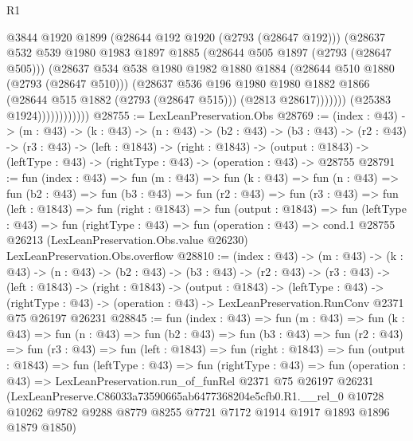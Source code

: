 \begin{lexlean}{R1}
\begin{coremodule}
                                @3844
                                @1920
                                @1899
                                (@28644 @192 @1920 (@2793 (@28647 @192)))
                                (@28637
                                  @532
                                  @539
                                  @1980
                                  @1983
                                  @1897
                                  @1885
                                  (@28644 @505 @1897 (@2793 (@28647 @505)))
                                  (@28637
                                    @534
                                    @538
                                    @1980
                                    @1982
                                    @1880
                                    @1884
                                    (@28644 @510 @1880 (@2793 (@28647 @510)))
                                    (@28637
                                      @536
                                      @196
                                      @1980
                                      @1980
                                      @1882
                                      @1866
                                      (@28644 @515 @1882 (@2793 (@28647 @515)))
                                      (@2813 @28617)))))))
                          (@25383 @1924))))))))))))
@28755 := LexLeanPreservation.Obs
@28769 := (index : @43) ->
  (m : @43) ->
  (k : @43) ->
  (n : @43) ->
  (b2 : @43) ->
  (b3 : @43) ->
  (r2 : @43) ->
  (r3 : @43) ->
  (left : @1843) ->
  (right : @1843) ->
  (output : @1843) -> (leftType : @43) -> (rightType : @43) -> (operation : @43) -> @28755
@28791 := fun (index : @43) =>
  fun (m : @43) =>
  fun (k : @43) =>
  fun (n : @43) =>
  fun (b2 : @43) =>
  fun (b3 : @43) =>
  fun (r2 : @43) =>
  fun (r3 : @43) =>
  fun (left : @1843) =>
  fun (right : @1843) =>
  fun (output : @1843) =>
  fun (leftType : @43) =>
  fun (rightType : @43) =>
  fun (operation : @43) =>
  cond.{1} @28755 @26213 (LexLeanPreservation.Obs.value @26230) LexLeanPreservation.Obs.overflow
@28810 := (index : @43) ->
  (m : @43) ->
  (k : @43) ->
  (n : @43) ->
  (b2 : @43) ->
  (b3 : @43) ->
  (r2 : @43) ->
  (r3 : @43) ->
  (left : @1843) ->
  (right : @1843) ->
  (output : @1843) ->
  (leftType : @43) ->
  (rightType : @43) -> (operation : @43) -> LexLeanPreservation.RunConv @2371 @75 @26197 @26231
@28845 := fun (index : @43) =>
  fun (m : @43) =>
  fun (k : @43) =>
  fun (n : @43) =>
  fun (b2 : @43) =>
  fun (b3 : @43) =>
  fun (r2 : @43) =>
  fun (r3 : @43) =>
  fun (left : @1843) =>
  fun (right : @1843) =>
  fun (output : @1843) =>
  fun (leftType : @43) =>
  fun (rightType : @43) =>
  fun (operation : @43) =>
  LexLeanPreservation.run_of_funRel
    @2371
    @75
    @26197
    @26231
    (LexLeanPreserve.C86033a73590665ab6477368204e5cfb0.R1.__rel_0
      @10728
      @10262
      @9782
      @9288
      @8779
      @8255
      @7721
      @7172
      @1914
      @1917
      @1893
      @1896
      @1879
      @1850)
\end{coremodule}
\end{lexlean}

